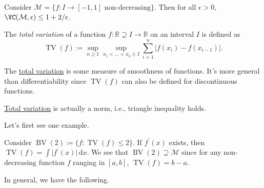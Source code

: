 \begin{eg}
	Consider \(\mathcal{M} = \{ f\colon I \to [-1, 1] \text{ non-decreasing}  \} \). Then for all \(\epsilon > 0\), \(\VC(\mathcal{M} , \epsilon ) \leq 1 + 2 / \epsilon \).
\end{eg}

\begin{definition}\label{def:total-variation}
	The \emph{total variation} of a function \(f \colon \mathbb{R} \supseteq I \to \mathbb{R} \) on an interval \(I\) is defined as
	\[
		\mathop{\mathrm{TV}}(f) \coloneqq \sup _{n \geq 1} \sup _{x_1 < \dots < x_n \in I} \sum_{i=1}^{n} \vert f(x_i) - f(x_{i-1}) \vert.
	\]
\end{definition}

\begin{intuition}
	The \hyperref[def:total-variation]{total variation} is some measure of smoothness of functions. It's more general than differentiability since \(\mathop{\mathrm{TV}}(f) \) can also be defined for discontinuous functions.
\end{intuition}

\begin{remark}
	\hyperref[def:total-variation]{Total variation} is actually a norm, i.e., triangle inequality holds.
\end{remark}

Let's first see one example.

\begin{eg}
	Consider \(\mathop{\mathrm{BV}}(2) \coloneqq \{ f \colon \mathop{\mathrm{TV}}(f) \leq 2 \} \). If \(f^{\prime} (x)\) exists, then \(\mathop{\mathrm{TV}}(f) = \int \vert f^{\prime} (x) \vert \,\mathrm{d} x\). We see that \(\mathop{\mathrm{BV}}(2) \supseteq \mathcal{M} \) since for any non-decreasing function \(f\) ranging in \([a, b]\), \(\mathop{\mathrm{TV}}(f) = b - a\).
\end{eg}

In general, we have the following.

